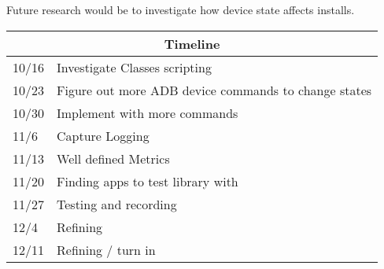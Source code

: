 Future research would be to investigate how device state affects installs.

\begin{tabular}{ |p{3cm}||p{3cm}| }
	\hline
	\multicolumn{2}{|c|}{Timeline} \\
	\hline
		10/16 & Investigate Classes scripting \\
		\hline
	10/23&   Figure out more ADB device commands to change states  \\
	\hline
	10/30 &Implement with more commands \\
	\hline
	11/6    &Capture Logging	 \\
	\hline
	11/13& Well defined Metrics \\
	\hline
	11/20& Finding apps to test library with  \\
	\hline
	11/27& Testing and recording \\
	\hline
	12/4 & Refining \\
	\hline
	12/11 & Refining / turn in \\
	\hline
	
\end{tabular}
\\